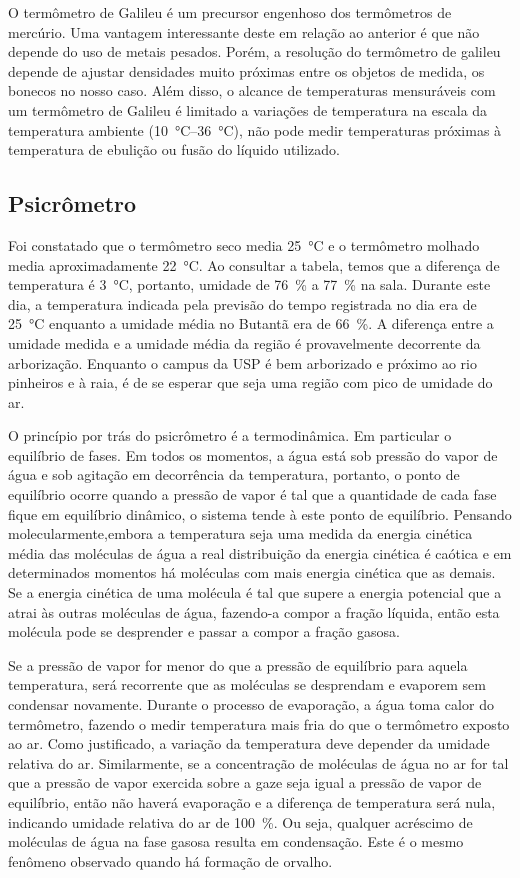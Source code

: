 O termômetro de Galileu é um precursor engenhoso dos termômetros de mercúrio. Uma vantagem interessante deste em relação ao anterior é que não depende do uso de metais pesados. Porém, a resolução do termômetro de galileu depende de ajustar densidades muito próximas entre os objetos de medida, os bonecos no nosso caso. Além disso, o alcance de temperaturas mensuráveis com um termômetro de Galileu é limitado a variações de temperatura na escala da temperatura ambiente (\qty{10}{\celsius}--\qty{36}{\celsius}), não pode medir temperaturas próximas à temperatura de ebulição ou fusão do líquido utilizado. 

\subsection{Psicrômetro}
Foi constatado que o termômetro seco media \qty{25}{\celsius} e o termômetro molhado media aproximadamente \qty{22}{\celsius}. Ao consultar a tabela, temos que a diferença de temperatura é \qty{3}{\celsius}, portanto, umidade de \qty{76}{\percent} a \qty{77}{\percent} na sala. Durante este dia, a temperatura indicada pela previsão do tempo registrada no dia era de \qty{25}{\celsius} enquanto a umidade média no Butantã era de \qty{66}{\percent}. A diferença entre a umidade medida e a umidade média da região é provavelmente decorrente da arborização. Enquanto o campus da USP é bem arborizado e próximo ao rio pinheiros e à raia, é de se esperar que seja uma região com pico de umidade do ar. 

O princípio por trás do psicrômetro é a termodinâmica. Em particular o equilíbrio de fases. Em todos os momentos, a água está sob pressão do vapor de água e sob agitação em decorrência da temperatura, portanto, o ponto de equilíbrio ocorre quando a pressão de vapor é tal que a quantidade de cada fase fique em equilíbrio dinâmico, o sistema tende à este ponto de equilíbrio. Pensando molecularmente,embora a temperatura seja uma medida da energia cinética média das moléculas de água a real distribuição da energia cinética é caótica e em determinados momentos há moléculas com mais energia cinética que as demais. Se a energia cinética de uma molécula é tal que supere a energia potencial que a atrai às outras moléculas de água, fazendo-a compor a fração líquida, então esta molécula pode se desprender e passar a compor a fração gasosa. 

Se a pressão de vapor for menor do que a pressão de equilíbrio para aquela temperatura, será recorrente que as moléculas se desprendam e evaporem sem condensar novamente. Durante o processo de evaporação, a água toma calor do termômetro, fazendo o medir temperatura mais fria do que o termômetro exposto ao ar. Como justificado, a variação da temperatura deve depender da umidade relativa do ar. Similarmente, se a concentração de moléculas de água no ar for tal que a pressão de vapor exercida sobre a gaze seja igual a pressão de vapor de equilíbrio, então não haverá evaporação e a diferença de temperatura será nula, indicando umidade relativa do ar de \qty{100}{\percent}. Ou seja, qualquer acréscimo de moléculas de água na fase gasosa resulta em condensação. Este é o mesmo fenômeno observado quando há formação de orvalho.

